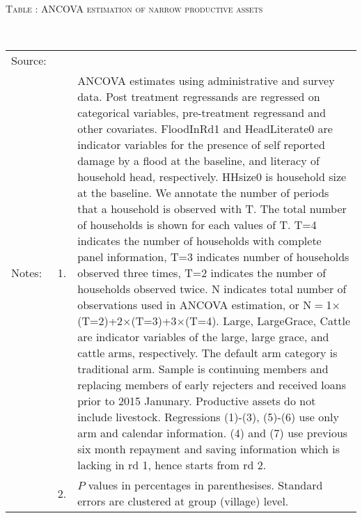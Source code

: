 \hspace{-1cm}\begin{minipage}[t]{14cm}
\hfil\textsc{\normalsize Table \thetable: ANCOVA estimation of narrow productive assets\label{tab ANCOVA narrow productive assets}}\\
\setlength{\tabcolsep}{1pt}
\setlength{\baselineskip}{8pt}
\renewcommand{\arraystretch}{.55}
\hfil{}\\
\renewcommand{\arraystretch}{.8}
\setlength{\tabcolsep}{1pt}
\begin{tabular}{>{\hfill\scriptsize}p{1cm}<{}>{\hfill\scriptsize}p{.25cm}<{}>{\scriptsize}p{12cm}<{\hfill}}
Source:& \multicolumn{2}{l}{\scriptsize Estimated with GUK administrative and survey data.}\\
Notes: & 1. & ANCOVA estimates using administrative and survey data. Post treatment regressands are regressed on categorical variables, pre-treatment regressand and other covariates. \textsf{FloodInRd1} and \textsf{HeadLiterate0} are indicator variables for the presence of self reported damage by a flood at the baseline, and literacy of household head, respectively. \textsf{HHsize0} is household size at the baseline. We annotate the number of periods that a household is observed with \textsf{T}. The total number of households is shown for each values of \textsf{T}. \textsf{T=4} indicates the number of households with complete panel information, \textsf{T=3} indicates number of households observed three times, \textsf{T=2} indicates the number of households observed twice. \textsf{N} indicates total number of observations used in ANCOVA estimation, or \textsf{N$=$1$\times$(T=2)+2$\times$(T=3)+3$\times$(T=4)}.  \textsf{Large}, \textsf{LargeGrace}, \textsf{Cattle} are indicator variables of the \textsf{large}, \textsf{large grace}, and \textsf{cattle} arms, respectively. The default arm category is \textsf{traditional} arm. Sample is continuing members and replacing members of early rejecters and received loans prior to 2015 Janunary. Productive assets do not include livestock. Regressions (1)-(3), (5)-(6) use only arm and calendar information. (4) and (7) use previous six month repayment and saving information which is lacking in rd 1, hence starts from rd 2.\\
& 2. & $P$ values in percentages in parenthesises. Standard errors are clustered at group (village) level.
\end{tabular}
\end{minipage}

